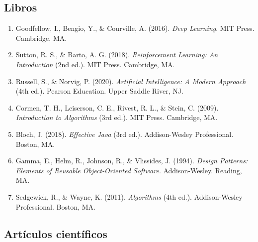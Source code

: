 \documentclass[12pt,a4paper]{article}
\begin{document}
\subsection{Libros}

\begin{enumerate}[label=]
    \item Goodfellow, I., Bengio, Y., \& Courville, A. (2016). \textit{Deep Learning}. MIT Press. Cambridge, MA.
    
    \item Sutton, R. S., \& Barto, A. G. (2018). \textit{Reinforcement Learning: An Introduction} (2nd ed.). MIT Press. Cambridge, MA.
    
    \item Russell, S., \& Norvig, P. (2020). \textit{Artificial Intelligence: A Modern Approach} (4th ed.). Pearson Education. Upper Saddle River, NJ.
    
    \item Cormen, T. H., Leiserson, C. E., Rivest, R. L., \& Stein, C. (2009). \textit{Introduction to Algorithms} (3rd ed.). MIT Press. Cambridge, MA.
    
    \item Bloch, J. (2018). \textit{Effective Java} (3rd ed.). Addison-Wesley Professional. Boston, MA.
    
    \item Gamma, E., Helm, R., Johnson, R., \& Vlissides, J. (1994). \textit{Design Patterns: Elements of Reusable Object-Oriented Software}. Addison-Wesley. Reading, MA.
    
    \item Sedgewick, R., \& Wayne, K. (2011). \textit{Algorithms} (4th ed.). Addison-Wesley Professional. Boston, MA.
\end{enumerate}

\subsection{Artículos científicos}
\end{document}
